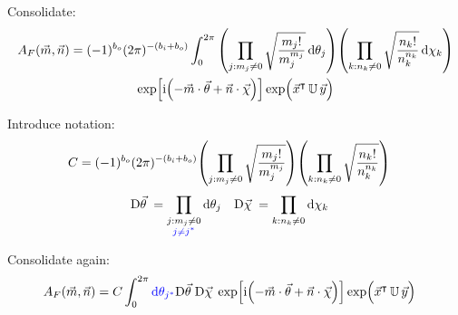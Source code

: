 \documentclass[
	english,
	a4paper,
	fontsize=10pt,
	parskip=half,
	titlepage=true,
	DIV=12,
	final
]{scrreprt}
\newcommand*{\transp}{\ensuremath{^\intercal}}
\newcommand*{\iunit}{\ensuremath{\mathrm{i}}}
\newcommand*{\DD}[1]{\ensuremath{\text{D}\vec{#1}\;}}
\begin{document}
Consolidate:
\begin{multline}
	A_F(\vec{m}, \vec{n})
=
	(-1)^{b_o}
	(2\pi)^{-(b_i + b_o)}
	\int_{0}^{2\pi}
		\qty( \prod_{j : m_j \neq 0}
			\sqrt{\frac
				{ m_j! }
				{ m_j^{m_j} }
			} \dd{\theta_j}
		)
		\qty( \prod_{k : n_k \neq 0}
			\sqrt{\frac
				{ n_k! }
				{ n_k^{n_k} }
			} \dd{\chi_k}
		)
\\
		\exp[
			\iunit \qty(
			-\vec{m} \cdot \vec{\theta}
			+\vec{n} \cdot \vec{\chi}
		)]
		\exp( \Big. \vec{x}\transp \, \mathbb{U} \, \vec{y})
\end{multline}

Introduce notation:
\begin{align}
	C
&=
	(-1)^{b_o}
	(2\pi)^{-(b_i + b_o)}
	\qty( \prod_{j : m_j \neq 0}
		\sqrt{\frac
			{ m_j! }
			{ m_j^{m_j} }
		}
	)
	\qty( \prod_{k : n_k \neq 0}
		\sqrt{\frac
			{ n_k! }
			{ n_k^{n_k} }
		}
	)
\label{eqn:DefC}
\end{align}
\begin{align}
	\DD{\theta}
&=
	\prod_{\substack{j : m_j \neq 0 \\ {\color{blue} j \neq j^*}}}
		\dd{\theta_j}
&
	\DD{\chi}
&=
	\prod_{k : n_k \neq 0}
		\dd{\chi  _k}
\end{align}

Consolidate again:
\begin{align}
	A_F(\vec{m}, \vec{n})
&=
	C
	\int_{0}^{2\pi}
		{\color{blue} \dd{\theta_{j^*}}}
		\DD{\theta}
		\DD{\chi  }
			\exp[
				\iunit \qty(
				-\vec{m} \cdot \vec{\theta}
				+\vec{n} \cdot \vec{\chi}
			)]
			\exp( \Big. \vec{x}\transp \, \mathbb{U} \, \vec{y})
	\label{eqn:BSA_Int_BZO_Polar}
\end{align}
\end{document}
